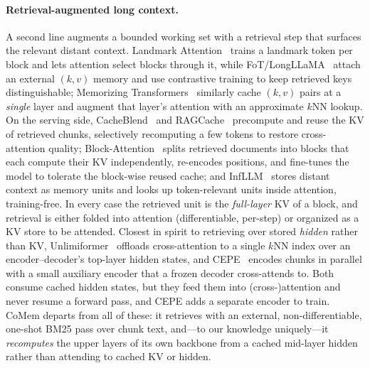 \paragraph{Retrieval-augmented long context.} A second line augments a bounded
working set with a retrieval step that surfaces the relevant distant context.
Landmark Attention~\citep{landmark} trains a landmark token per block and lets
attention select blocks through it, while FoT/LongLLaMA~\citep{longllama} attach
an external $(k,v)$ memory and use contrastive training to keep retrieved keys
distinguishable; Memorizing Transformers~\citep{memtransformers} similarly cache
$(k,v)$ pairs at a \emph{single} layer and augment that layer's attention with an
approximate $k$NN lookup. On the serving side, CacheBlend~\citep{cacheblend} and
RAGCache~\citep{ragcache} precompute and reuse the KV of retrieved chunks,
selectively recomputing a few tokens to restore cross-attention quality;
Block-Attention~\citep{blockattn} splits retrieved documents into blocks that
each compute their KV independently, re-encodes positions, and fine-tunes the
model to tolerate the block-wise reused cache; and
InfLLM~\citep{infllm} stores distant context as memory units and looks up
token-relevant units inside attention, training-free. In every case the
retrieved unit is the \emph{full-layer} KV of a block, and retrieval is either
folded into attention (differentiable, per-step) or organized as a KV store to
be attended. Closest in spirit to retrieving over stored \emph{hidden} rather
than KV, Unlimiformer~\citep{unlimiformer} offloads cross-attention to a single
$k$NN index over an encoder--decoder's top-layer hidden states, and
CEPE~\citep{cepe} encodes chunks in parallel with a small auxiliary encoder that
a frozen decoder cross-attends to. Both consume cached hidden states, but they
feed them into (cross-)attention and never resume a forward pass, and CEPE adds a
separate encoder to train. CoMem departs from all of these: it retrieves with an
external, non-differentiable, one-shot BM25 pass over chunk text, and---to our
knowledge uniquely---it \emph{recomputes} the upper layers of its own backbone
from a cached mid-layer hidden rather than attending to cached KV or hidden.

